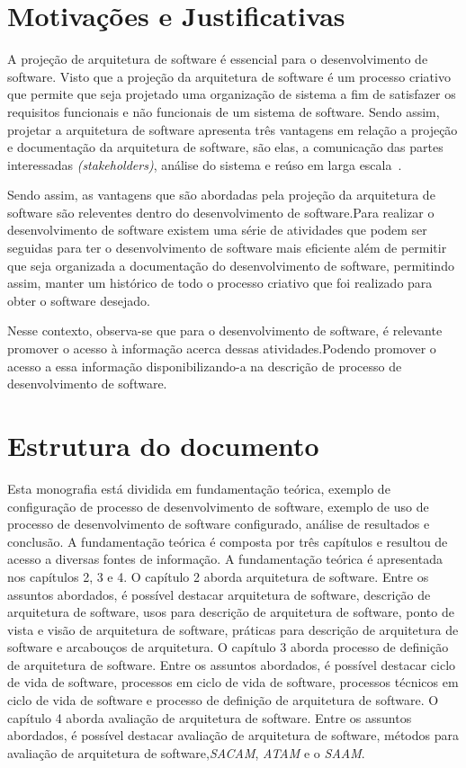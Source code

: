 \section{Motivações e Justificativas}

A projeção de arquitetura de software é essencial para o desenvolvimento de software. Visto que a projeção da arquitetura de software é um processo criativo que permite que seja projetado uma organização de sistema a fim de satisfazer os requisitos funcionais e não funcionais de um sistema de software. Sendo assim, projetar a arquitetura de software apresenta três vantagens em relação a projeção e documentação da arquitetura de software, são elas, a comunicação das partes interessadas \emph{(stakeholders)}, análise do sistema e reúso em larga escala~\cite{Sommerville_2011_texbook}.

Sendo assim, as vantagens que são abordadas pela projeção da arquitetura de software são releventes dentro do desenvolvimento de software.Para realizar o desenvolvimento de software existem uma série de atividades que podem ser seguidas para ter o desenvolvimento de software mais eficiente além de permitir que seja organizada a documentação do desenvolvimento de software, permitindo assim, manter um histórico de todo o processo criativo que foi realizado para obter o software desejado.

Nesse contexto, observa-se que para o desenvolvimento de software, é relevante promover o acesso à informação acerca dessas atividades.Podendo promover o acesso a essa informação disponibilizando-a na descrição de processo de desenvolvimento de software.

\section{Estrutura do documento}

Esta monografia está dividida em fundamentação teórica, exemplo de configuração de processo de desenvolvimento de software, exemplo de uso de processo de desenvolvimento de software configurado, análise de resultados e conclusão. A fundamentação teórica é composta por três capítulos e resultou de acesso a diversas fontes de informação. A fundamentação teórica é apresentada nos capítulos 2, 3 e 4. O capítulo 2 aborda arquitetura de software. Entre os assuntos abordados, é possível destacar arquitetura de software, descrição de arquitetura de software, usos para descrição de arquitetura de software, ponto de vista e visão de arquitetura de software, práticas para descrição de arquitetura de software e arcabouços de arquitetura. O capítulo 3 aborda processo de definição de arquitetura de software. Entre os assuntos abordados, é possível destacar ciclo de vida de software, processos em ciclo de vida de software, processos técnicos em ciclo de vida de software e processo de definição de arquitetura de software. O capítulo  4 aborda avaliação de arquitetura de software. Entre os assuntos abordados, é possível destacar avaliação de arquitetura de software, métodos para avaliação de arquitetura de software,\emph{\acrfull{SACAM}}, \emph{\acrfull{ATAM}} e o \emph{\acrfull{SAAM}}. 

